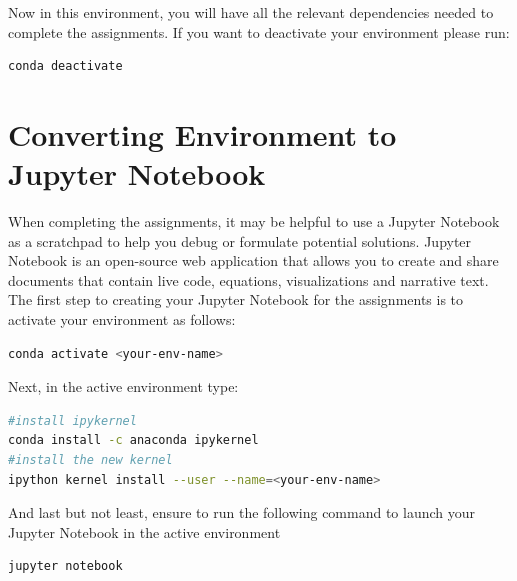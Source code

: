 \documentclass{article}
\begin{document}
Now in this environment, you will have all the relevant dependencies needed to complete the assignments. If you want to deactivate your environment please run:
\begin{lstlisting}[language=bash]
conda deactivate
\end{lstlisting}
 
\section{Converting Environment to Jupyter Notebook}
When completing the assignments, it may be helpful to use a Jupyter Notebook as a scratchpad to help you debug or formulate potential solutions. Jupyter Notebook is an open-source web application that allows you to create and share documents that contain live code, equations, visualizations and narrative text. The first step to creating your Jupyter Notebook for the assignments is to activate your environment as follows:
\begin{lstlisting}[language=bash]
conda activate <your-env-name>
\end{lstlisting}

Next, in the active environment type:
\begin{lstlisting}[language=bash]
#install ipykernel
conda install -c anaconda ipykernel
#install the new kernel
ipython kernel install --user --name=<your-env-name>
\end{lstlisting}

And last but not least, ensure to run the following command to launch your Jupyter Notebook in the active environment
\begin{lstlisting}[language=bash]
jupyter notebook
\end{lstlisting}
\end{document}
